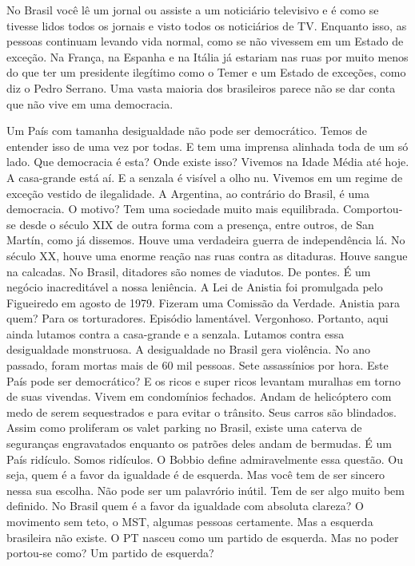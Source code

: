 \falaG No Brasil você lê um jornal ou assiste a um noticiário televisivo e é
como se tivesse lidos todos os jornais e visto todos os noticiários de
TV. Enquanto isso, as pessoas continuam levando vida normal, como se não
vivessem em um Estado de exceção. Na França, na Espanha e na Itália já
estariam nas ruas por muito menos do que ter um presidente ilegítimo
como o Temer e um Estado de exceções, como diz o Pedro Serrano. Uma
vasta maioria dos brasileiros parece não se dar conta que não vive em
uma democracia.

\falaM Um País com tamanha desigualdade não pode ser democrático. Temos de
entender isso de uma vez por todas. E tem uma imprensa alinhada toda de
um só lado. Que democracia é esta? Onde existe isso? Vivemos na Idade
Média até hoje. A casa-grande está aí. E a senzala é visível a olho nu.
Vivemos em um regime de exceção vestido de ilegalidade. A Argentina, ao
contrário do Brasil, é uma democracia. O motivo? Tem uma sociedade muito
mais equilibrada. Comportou-se desde o século XIX de outra forma com a
presença, entre outros, de San Martín, como já dissemos. Houve uma
verdadeira guerra de independência lá. No século XX, houve uma enorme
reação nas ruas contra as ditaduras. Houve sangue na calcadas. No
Brasil, ditadores são nomes de viadutos. De pontes. É um negócio
inacreditável a nossa leniência. A Lei de Anistia foi promulgada pelo
Figueiredo em agosto de 1979. Fizeram uma Comissão da Verdade. Anistia
para quem? Para os torturadores. Episódio lamentável. Vergonhoso.
Portanto, aqui ainda lutamos contra a casa-grande e a senzala. Lutamos
contra essa desigualdade monstruosa. A desigualdade no Brasil gera
violência. No ano passado, foram mortas mais de 60 mil pessoas. Sete
assassínios por hora. Este País pode ser democrático? E os ricos e super
ricos levantam muralhas em torno de suas vivendas. Vivem em condomínios
fechados. Andam de helicóptero com medo de serem sequestrados e para
evitar o trânsito. Seus carros são blindados. Assim como proliferam os
valet parking no Brasil, existe uma caterva de seguranças engravatados
enquanto os patrões deles andam de bermudas. É um País ridículo. Somos
ridículos. O Bobbio define admiravelmente essa questão. Ou seja, quem é
a favor da igualdade é de esquerda. Mas você tem de ser sincero nessa
sua escolha. Não pode ser um palavrório inútil. Tem de ser algo muito
bem definido. No Brasil quem é a favor da igualdade com absoluta
clareza? O movimento sem teto, o MST, algumas pessoas certamente. Mas a
esquerda brasileira não existe. O PT nasceu como um partido de esquerda.
Mas no poder portou-se como? Um partido de esquerda?

